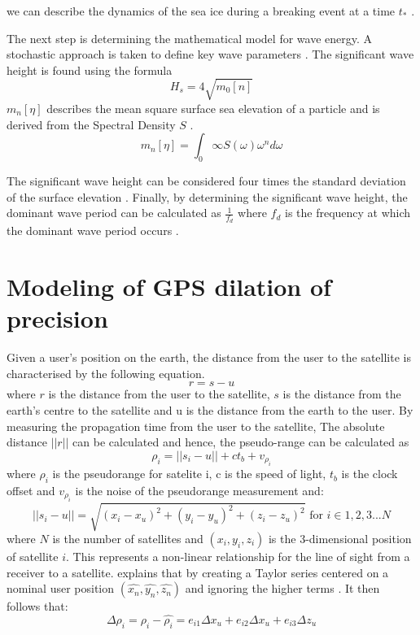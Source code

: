 we can describe the dynamics of the sea ice during a breaking event at a time $t_*$  \cite{williams2013wave}. \par

The next step is determining the mathematical model for wave energy. A stochastic approach is taken to define key wave parameters \cite{williams2013wave}. The significant wave height is found using the formula
\begin{equation}
	H_s = 4\sqrt{m_0[n]}
\end{equation}
$m_n[\eta]$ describes the mean square surface sea elevation of a particle and is derived from the Spectral Density $S$ \cite{williams2013wave}.
\begin{equation}
	m_n[\eta] = \int_{0}{\infty}S(\omega)\omega^nd\omega
\end{equation}

The significant wave height can be considered four times the standard deviation of the surface elevation \cite{meylan2014situ}. Finally, by determining the significant wave height, the dominant wave period can be calculated as $\frac{1}{f_d}$ where $f_d$ is the frequency at which the dominant wave period occurs \cite{meylan2014situ}.

\section{ Modeling of GPS dilation of precision}
\label{appendix:GPS_DOP} 
Given a user's position on the earth, the distance from the user to the satellite is characterised by the following equation.
\begin{equation}
	r =  s - u
\end{equation}
where $r$ is the distance from the user to the satellite, $s$ is the distance from the earth's centre to the satellite and u is the distance from the earth to the user. By measuring the propagation time from the user to the satellite, The absolute distance $||r||$ can be calculated and hence, the pseudo-range can be calculated as
\begin{equation}
	\rho_i = ||s_i-u||+ct_b + v_{\rho_i}
\end{equation}
where $\rho_i$ is the pseudorange for satelite i, c is the speed of light, $t_b$ is  the clock offset and $v_{\rho_i}$ is the noise of the pseudorange measurement and:
\begin{equation}
	||s_i-u|| = \sqrt{(x_i - x_u)^2+(y_i-y_u)^2+(z_i-z_u)^2} \text{ for } i \in 1,2,3...N \label{los}
\end{equation}
where $N$ is the number of satellites and $(x_i,y_i,z_i)$ is the 3-dimensional position of satellite $i$. This represents a non-linear relationship for the line of sight from a receiver to a satellite.  \textcite{jwo2001efficient} explains that by creating a Taylor series centered on a nominal user position $(\hat{x_n},\hat{y_n},\hat{z_n})$ and ignoring the higher terms \cite{jwo2001efficient}. It then follows that:
\begin{equation}
	\Delta\rho_i = \rho_i - \hat{\rho_i} = e_{i1}\Delta x_u + e_{i2}\Delta x_u +  e_{i3}\Delta z_u
\end{equation}

